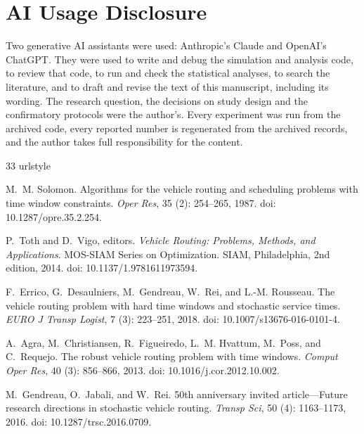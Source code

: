 \documentclass[12pt,letterpaper]{article}
\begin{document}
\section*{AI Usage Disclosure}
Two generative AI assistants were used: Anthropic's Claude and OpenAI's ChatGPT.
They were used to write and debug the simulation and analysis code, to review that
code, to run and check the statistical analyses, to search the literature, and to
draft and revise the text of this manuscript, including its wording. The research
question, the decisions on study design and the confirmatory protocols were the
author's. Every experiment was run from the archived code, every reported number is
regenerated from the archived records, and the author takes full responsibility for
the content.

\begin{thebibliography}{33}
\providecommand{\natexlab}[1]{#1}
\providecommand{\url}[1]{\texttt{#1}}
\expandafter\ifx\csname urlstyle\endcsname\relax
  \providecommand{\doi}[1]{doi: #1}\else
  \providecommand{\doi}{doi: \begingroup \urlstyle{rm}\Url}\fi

M.~M. Solomon.
\newblock Algorithms for the vehicle routing and scheduling problems with time
  window constraints.
\newblock \emph{Oper Res}, 35 (2): 254--265, 1987.
\newblock \doi{10.1287/opre.35.2.254}.

P.~Toth and D.~Vigo, editors.
\newblock \emph{Vehicle Routing: Problems, Methods, and Applications}.
\newblock MOS-SIAM Series on Optimization. SIAM, Philadelphia, 2nd edition,
  2014.
\newblock \doi{10.1137/1.9781611973594}.

F.~Errico, G.~Desaulniers, M.~Gendreau, W.~Rei, and L.-M. Rousseau.
\newblock The vehicle routing problem with hard time windows and stochastic
  service times.
\newblock \emph{EURO J Transp Logist}, 7 (3): 223--251, 2018.
\newblock \doi{10.1007/s13676-016-0101-4}.

A.~Agra, M.~Christiansen, R.~Figueiredo, L.~M. Hvattum, M.~Poss, and
  C.~Requejo.
\newblock The robust vehicle routing problem with time windows.
\newblock \emph{Comput Oper Res}, 40 (3): 856--866, 2013.
\newblock \doi{10.1016/j.cor.2012.10.002}.

M.~Gendreau, O.~Jabali, and W.~Rei.
\newblock 50th anniversary invited article---{Future} research directions in
  stochastic vehicle routing.
\newblock \emph{Transp Sci}, 50 (4): 1163--1173, 2016.
\newblock \doi{10.1287/trsc.2016.0709}.


\end{thebibliography}
\end{document}
